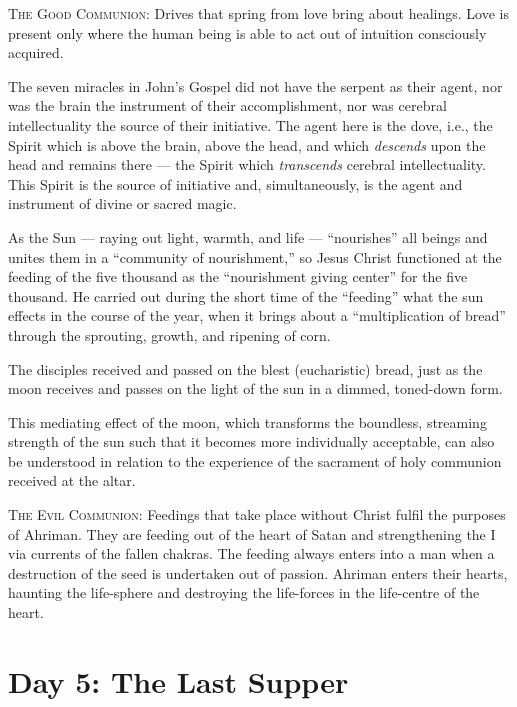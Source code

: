 \textsc{The Good Communion}:
Drives that spring from love bring about healings. Love is present only where the human being is able to act out of intuition consciously acquired.

\begin{quotex}
The seven miracles in John's Gospel did not have the serpent as their agent, nor was the brain the instrument of their accomplishment, nor was cerebral intellectuality the source of their initiative. The agent here is the dove, i.e., the Spirit which is above the brain, above the head, and which \emph{descends} upon the head and remains there — the Spirit which \emph{transcends} cerebral intellectuality. This Spirit is the source of initiative and, simultaneously, is the agent and instrument of divine or sacred magic. 

\end{quotex}

As the Sun — raying out light, warmth, and life — ``nourishes'' all beings and unites them in a ``community of nourishment,'' so Jesus Christ functioned at the feeding of the five thousand as the ``nourishment giving center'' for the five thousand. He carried out during the short time of the ``feeding'' what the sun effects in the course of the year, when it brings about a ``multiplication of bread'' through the sprouting, growth, and ripening of corn.

The disciples received and passed on the blest (eucharistic) bread, just as the moon receives and passes on the light of the sun in a dimmed, toned-down form.

This mediating effect of the moon, which transforms the boundless, streaming strength of the sun such that it becomes more individually acceptable, can also be understood in relation to the experience of the sacrament of holy communion received at the altar.

\textsc{The Evil Communion}:
Feedings that take place without Christ fulfil the purposes of Ahriman. They are feeding out of the heart of Satan and strengthening the I via currents of the fallen chakras. The feeding always enters into a man when a destruction of the seed is undertaken out of passion. Ahriman enters their hearts, haunting the life-sphere and destroying the life-forces in the life-centre of the heart.

\section{Day 5: The Last Supper}

